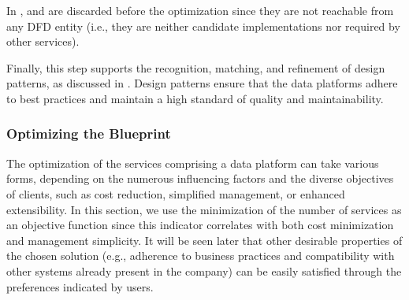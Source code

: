 \begin{example}
In ,  and  are discarded before the optimization since they are not reachable from any DFD entity (i.e., they are neither candidate implementations nor required by other services).
\end{example}

Finally, this step supports the recognition, matching, and refinement of design patterns, as discussed in . Design patterns ensure that the data platforms adhere to best practices and maintain a high standard of quality and maintainability.

\subsubsection{Optimizing the Blueprint}
\label{ssec:pdd-opt}

The optimization of the services comprising a data platform can take various forms, depending on the numerous influencing factors and the diverse objectives of clients, such as cost reduction, simplified management, or enhanced extensibility. In this section, we use the minimization of the number of services as an objective function since this indicator correlates with both cost minimization and management simplicity. It will be seen later that other desirable properties of the chosen solution (e.g., adherence to business practices and compatibility with other systems already present in the company) can be easily satisfied through the preferences indicated by users.

